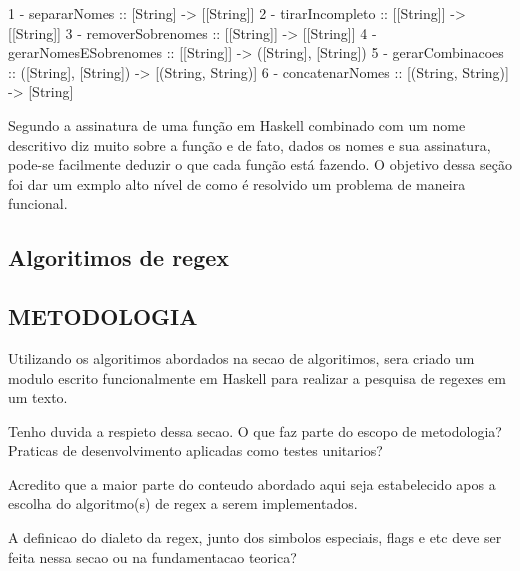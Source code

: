 1 - separarNomes :: [String] -> [[String]]
2 - tirarIncompleto :: [[String]] -> [[String]]
3 - removerSobrenomes :: [[String]] -> [[String]]
4 - gerarNomesESobrenomes :: [[String]] -> ([String], [String])
5 - gerarCombinacoes :: ([String], [String]) -> [(String, String)]
6 - concatenarNomes :: [(String, String)] -> [String]

Segundo \cite{lipovaca} a assinatura de uma função em Haskell combinado com um nome descritivo diz muito sobre a função e de fato, dados os nomes e sua assinatura, pode-se facilmente deduzir o que cada função está fazendo.
O objetivo dessa seção foi dar um exmplo alto nível de como é resolvido um problema de maneira funcional.


\subsection{Algoritimos de regex}


\subsection{METODOLOGIA}

Utilizando os algoritimos abordados na secao de algoritimos, sera criado um modulo escrito funcionalmente em Haskell para realizar a pesquisa de regexes em um texto.

Tenho duvida a respieto dessa secao. O que faz parte do escopo de metodologia?
Praticas de desenvolvimento aplicadas como testes unitarios?

Acredito que a maior parte do conteudo abordado aqui seja estabelecido apos a escolha do algoritmo(s) de regex a serem implementados.

A definicao do dialeto da regex, junto dos simbolos especiais, flags e etc deve ser feita nessa secao ou na fundamentacao teorica?


